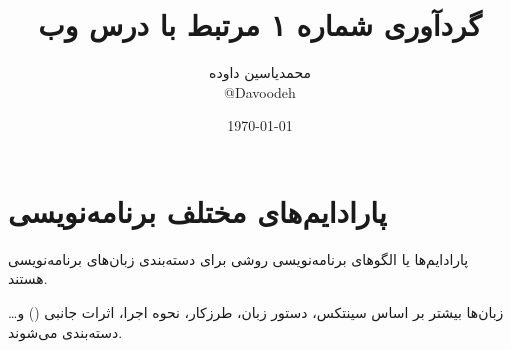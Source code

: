 \documentclass[a4paper]{article}
\author{محمدیاسین داوده\\\small @Davoodeh}
\title{گردآوری شماره ۱ مرتبط با درس وب}
\date{\today}
\begin{document}
\begin{titlingpage}
\maketitle


\tableofcontents
\end{titlingpage}

\section{پارادایم‌های مختلف برنامه‌نویسی}
پارادایم‌ها یا الگو‌های برنامه‌نویسی روشی برای دسته‌بندی زبان‌های برنامه‌نویسی هستند.

زبان‌ها بیشتر بر اساس سینتکس، دستور زبان، طرزکار، نحوه اجرا، اثرات جانبی () و\ldots{} دسته‌بندی می‌شوند.
\end{document}
